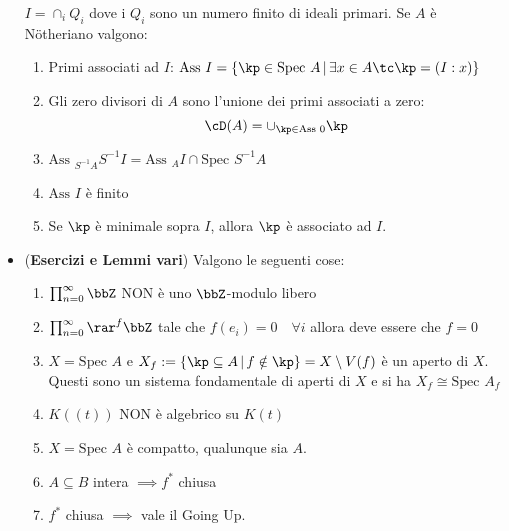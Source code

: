 \documentclass[a4paper,NoNotes,GeneralMath]{stdmdoc}
\newcommand{\Ass}{\text{Ass }}
\newcommand{\pipe}{\,|\,}
\newcommand{\Spec}{\text{Spec }}
\begin{document}
\begin{itemize}
  $I = \cap_i Q_i$ dove i $Q_i$ sono un numero finito di ideali
  primari. Se $A$ è Nötheriano valgono:
  \begin{enumerate}
  \item Primi associati ad $I$: $\Ass I = \{ \kp \in \Spec A \pipe \exists x
    \in A \tc \kp = (I : x) \}$
  \item Gli zero divisori di $A$ sono l'unione dei primi associati a
    zero: $$\cD(A) = \cup_{\kp \in \Ass 0} \kp$$
  \item $\Ass_{S^{-1}A} S^{-1}I = \Ass_{A} I \cap \Spec S^{-1}A$
  \item $\Ass I$ è finito
  \item Se $\kp$ è minimale sopra $I$, allora $\kp$ è associato ad $I$.
  \end{enumerate}

\item ({\bf Esercizi e Lemmi vari}) Valgono le seguenti cose:
  \begin{enumerate}
  \item $\prod_{n = 0}^\infty \bbZ$ NON è uno $\bbZ$-modulo libero
  \item $\prod_{n = 0}^\infty \rar^f \bbZ$ tale che $f(e_i) = 0 \quad
    \forall i$ allora deve essere che $f = 0$
  \item $X = \Spec A$ e
    $X_f := \{ \kp \subseteq A \pipe f \notin \kp \} = X \setminus V(f)$ è
    un aperto di $X$. Questi sono un sistema fondamentale di aperti di
    $X$ e si ha $X_f \cong \Spec A_f$
  \item $K((t))$ NON è algebrico su $K(t)$
  \item $X = \Spec A$ è compatto, qualunque sia $A$.
  \item $A \subseteq B$ intera $\implies f^*$ chiusa
  \item $f^*$ chiusa $\implies$ vale il Going Up.
  \end{enumerate}
\end{itemize}
\end{document}
